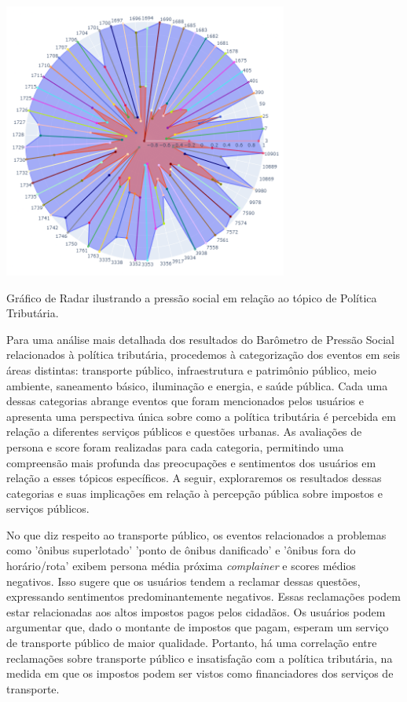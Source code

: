 \begin{quadro}[htb]
	\centering
	\includegraphics[width=0.7\textwidth]{images/social_barometer_taxes.png}
	\caption{Gráfico de Radar ilustrando a pressão social em relação ao tópico de Política Tributária.}
	\label{fig:social_barometer_taxes}
\end{quadro}

Para uma análise mais detalhada dos resultados do Barômetro de Pressão Social relacionados à política tributária, procedemos à categorização dos eventos em seis áreas distintas: transporte público, infraestrutura e patrimônio público, meio ambiente, saneamento básico, iluminação e energia, e saúde pública. Cada uma dessas categorias abrange eventos que foram mencionados pelos usuários e apresenta uma perspectiva única sobre como a política tributária é percebida em relação a diferentes serviços públicos e questões urbanas. As avaliações de persona e score foram realizadas para cada categoria, permitindo uma compreensão mais profunda das preocupações e sentimentos dos usuários em relação a esses tópicos específicos. A seguir, exploraremos os resultados dessas categorias e suas implicações em relação à percepção pública sobre impostos e serviços públicos.

No que diz respeito ao transporte público, os eventos relacionados a problemas como 'ônibus superlotado' 'ponto de ônibus danificado' e 'ônibus fora do horário/rota' exibem persona média próxima \textit{complainer} e scores médios negativos. Isso sugere que os usuários tendem a reclamar dessas questões, expressando sentimentos predominantemente negativos. Essas reclamações podem estar relacionadas aos altos impostos pagos pelos cidadãos. Os usuários podem argumentar que, dado o montante de impostos que pagam, esperam um serviço de transporte público de maior qualidade. Portanto, há uma correlação entre reclamações sobre transporte público e insatisfação com a política tributária, na medida em que os impostos podem ser vistos como financiadores dos serviços de transporte.

